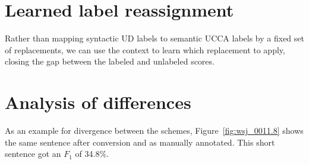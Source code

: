\documentclass[11pt,a4paper]{article}
\begin{document}
\section{Learned label reassignment}\label{sec:learning}

Rather than mapping syntactic UD labels to semantic UCCA labels
by a fixed set of replacements, we can use the context to learn
which replacement to apply, closing the gap between the labeled
and unlabeled scores.


\section{Analysis of differences}\label{sec:analysis}



As an example for divergence between the schemes, Figure~\ref{fig:wsj_0011.8} shows
the same sentence after conversion and as manually annotated.
This short sentence got an $F_1$ of 34.8\%.
\end{document}
